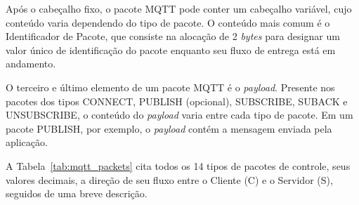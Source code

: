 Após o cabeçalho fixo, o pacote MQTT pode conter um cabeçalho variável, cujo conteúdo varia dependendo do tipo de pacote. O conteúdo mais comum é o Identificador de Pacote, que consiste na alocação de 2 \textit{bytes} para designar um valor único de identificação do pacote enquanto seu fluxo de entrega está em andamento.

O terceiro e último elemento de um pacote  MQTT é o \textit{payload}. Presente nos pacotes dos tipos CONNECT, PUBLISH (opcional), SUBSCRIBE, SUBACK e UNSUBSCRIBE, o conteúdo do \textit{payload} varia entre cada tipo de pacote. Em um pacote PUBLISH, por exemplo, o \textit{payload} contém a mensagem enviada pela aplicação.

A Tabela~\ref{tab:mqtt_packets} cita todos os 14 tipos de pacotes de controle, seus valores decimais, a direção de seu fluxo entre o Cliente (C) e o Servidor (S), seguidos de uma breve descrição.

